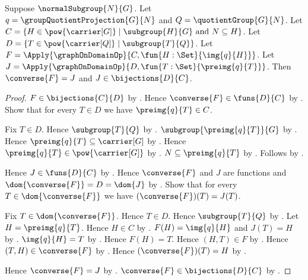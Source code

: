 \begin{theorem}\label{group_subgroup_correspondence_inverse_graph}
    Suppose $\normalSubgroup{N}{G}$.
    Let $q=\groupQuotientProjection{G}{N}$ and
        $Q=\quotientGroup{G}{N}$.
    Let
        $C=\{H\in\pow{\carrier[G]}\mid
            \text{$\subgroup{H}{G}$ and $N\subseteq H$}\}$.
    Let
        $D=\{T\in\pow{\carrier[Q]}\mid
            \text{$\subgroup{T}{Q}$}\}$.
    Let
        $F=\Apply{\graphOnDomainOp}{
            C,\fun{H:\Set}{\img{q}{H}}}$.
    Let
        $J=\Apply{\graphOnDomainOp}{
            D,\fun{T:\Set}{\preimg{q}{T}}}$.
    Then $\converse{F}=J$ and $J\in\bijections{D}{C}$.
\end{theorem}
\begin{proof}
    $F\in\bijections{C}{D}$ by
        .
    Hence $\converse{F}\in\funs{D}{C}$ by
        .
    Show that for every $T\in D$ we have $\preimg{q}{T}\in C$.
    \begin{subproof}
        Fix $T\in D$.
        Hence $\subgroup{T}{Q}$ by \auto.
        $\subgroup{\preimg{q}{T}}{G}$ by
            .
        Hence $\preimg{q}{T}\subseteq\carrier[G]$ by
            .
        Hence $\preimg{q}{T}\in\pow{\carrier[G]}$ by
            .
        $N\subseteq\preimg{q}{T}$ by
            .
        Follows by \auto.
    \end{subproof}
    Hence $J\in\funs{D}{C}$ by
        .
    Hence $\converse{F}$ and $J$ are functions and
        $\dom{\converse{F}}=D=\dom{J}$ by .
    Show that for every $T\in\dom{\converse{F}}$ we have
        $(\converse{F})(T)=J(T)$.
    \begin{subproof}
        Fix $T\in\dom{\converse{F}}$.
        Hence $T\in D$.
        Hence $\subgroup{T}{Q}$ by \auto.
        Let $H=\preimg{q}{T}$.
        Hence $H\in C$ by \auto.
        $F(H)=\img{q}{H}$ and $J(T)=H$ by
            .
        $\img{q}{H}=T$ by
            .
        Hence $F(H)=T$.
        Hence $(H,T)\in F$ by
            .
        Hence $(T,H)\in\converse{F}$ by .
        Hence $(\converse{F})(T)=H$ by
            .
    \end{subproof}
    Hence $\converse{F}=J$ by .
    $\converse{F}\in\bijections{D}{C}$ by
        .
\end{proof}

